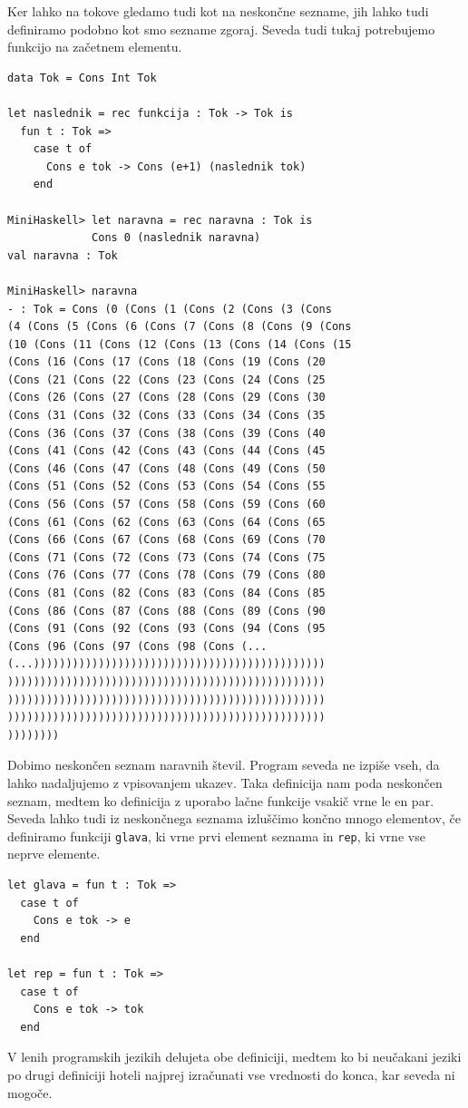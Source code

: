\documentclass[a4paper,12pt,openright]{book}
\begin{document}
Ker lahko na tokove gledamo tudi kot na neskončne sezname, jih lahko tudi definiramo podobno kot smo sezname zgoraj. Seveda tudi tukaj 
potrebujemo funkcijo na začetnem elementu.
\begin{lstlisting}
data Tok = Cons Int Tok

let naslednik = rec funkcija : Tok -> Tok is
  fun t : Tok =>
    case t of
      Cons e tok -> Cons (e+1) (naslednik tok)
    end

MiniHaskell> let naravna = rec naravna : Tok is
             Cons 0 (naslednik naravna)
val naravna : Tok

MiniHaskell> naravna
- : Tok = Cons (0 (Cons (1 (Cons (2 (Cons (3 (Cons 
(4 (Cons (5 (Cons (6 (Cons (7 (Cons (8 (Cons (9 (Cons 
(10 (Cons (11 (Cons (12 (Cons (13 (Cons (14 (Cons (15 
(Cons (16 (Cons (17 (Cons (18 (Cons (19 (Cons (20 
(Cons (21 (Cons (22 (Cons (23 (Cons (24 (Cons (25 
(Cons (26 (Cons (27 (Cons (28 (Cons (29 (Cons (30 
(Cons (31 (Cons (32 (Cons (33 (Cons (34 (Cons (35 
(Cons (36 (Cons (37 (Cons (38 (Cons (39 (Cons (40 
(Cons (41 (Cons (42 (Cons (43 (Cons (44 (Cons (45 
(Cons (46 (Cons (47 (Cons (48 (Cons (49 (Cons (50 
(Cons (51 (Cons (52 (Cons (53 (Cons (54 (Cons (55 
(Cons (56 (Cons (57 (Cons (58 (Cons (59 (Cons (60 
(Cons (61 (Cons (62 (Cons (63 (Cons (64 (Cons (65 
(Cons (66 (Cons (67 (Cons (68 (Cons (69 (Cons (70 
(Cons (71 (Cons (72 (Cons (73 (Cons (74 (Cons (75 
(Cons (76 (Cons (77 (Cons (78 (Cons (79 (Cons (80 
(Cons (81 (Cons (82 (Cons (83 (Cons (84 (Cons (85 
(Cons (86 (Cons (87 (Cons (88 (Cons (89 (Cons (90 
(Cons (91 (Cons (92 (Cons (93 (Cons (94 (Cons (95 
(Cons (96 (Cons (97 (Cons (98 (Cons (... 
(...)))))))))))))))))))))))))))))))))))))))))))))
)))))))))))))))))))))))))))))))))))))))))))))))))
)))))))))))))))))))))))))))))))))))))))))))))))))
)))))))))))))))))))))))))))))))))))))))))))))))))
))))))))
\end{lstlisting}
Dobimo neskončen seznam naravnih števil. Program seveda ne izpiše vseh, da lahko nadaljujemo z vpisovanjem ukazev. 
Taka definicija nam poda neskončen seznam, medtem ko definicija z uporabo lačne funkcije vsakič vrne le en par. 
Seveda lahko tudi iz neskončnega seznama izluščimo končno mnogo elementov, če definiramo funkciji \lstinline{glava}, 
ki vrne prvi element seznama in \lstinline{rep}, ki vrne vse neprve elemente. 
\begin{lstlisting}
let glava = fun t : Tok =>
  case t of 
    Cons e tok -> e
  end

let rep = fun t : Tok =>
  case t of 
    Cons e tok -> tok
  end
\end{lstlisting}
V lenih programskih jezikih delujeta obe definiciji, medtem ko 
bi neučakani jeziki po drugi definiciji hoteli najprej izračunati vse vrednosti do konca, kar seveda ni mogoče.  
\end{document}
